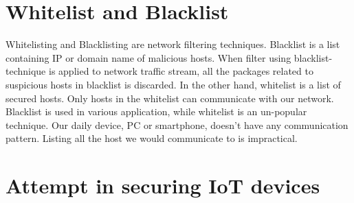 \section{Whitelist and Blacklist }
Whitelisting and Blacklisting are network filtering techniques. Blacklist is a list containing IP or domain name of malicious hosts. When filter using blacklist-technique is applied to network traffic stream, all the packages related to suspicious hosts in blacklist is discarded. In the other hand, whitelist is a list of secured hosts. Only hosts in the whitelist can communicate with our network. 
Blacklist is used in various application, while whitelist is an un-popular technique. Our daily device, PC or smartphone, doesn’t have any communication pattern. Listing all the host we would communicate to is impractical.  

\section{Attempt in securing IoT devices}
